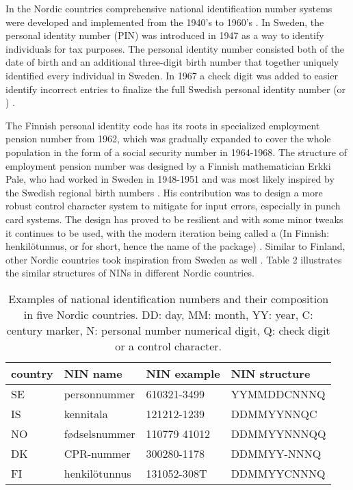 In the Nordic countries comprehensive national identification number systems were developed and implemented from the 1940's to 1960's \citep{watson2010}. In Sweden, the personal identity number (PIN) was introduced in 1947 as a way to identify individuals for tax purposes. The personal identity number consisted both of the date of birth and an additional three-digit birth number that together uniquely identified every individual in Sweden. In 1967 a check digit was added to easier identify incorrect entries to finalize the full Swedish personal identity number (or ) \citep{johansson2003,scb2016}. 

The Finnish personal identity code has its roots in specialized employment pension number from 1962, which was gradually expanded to cover the whole population in the form of a social security number in 1964-1968. The structure of employment pension number was designed by a Finnish mathematician Erkki Pale, who had worked in Sweden in 1948-1951 and was most likely inspired by the Swedish regional birth numbers \citep{alastalo2022}. His contribution was to design a more robust control character system to mitigate for input errors, especially in punch card systems. The design has proved to be resilient and with some minor tweaks it continues to be used, with the modern iteration being called a  (In Finnish: henkilötunnus, or  for short, hence the name of the package) \citep{salste2021}. Similar to Finland, other Nordic countries took inspiration from Sweden as well \citep{Krogness2011}. Table 2 illustrates the similar structures of NINs in different Nordic countries.

\begin{table}[ht]
\centering
\begin{tabular}{llll}
\toprule
  country & NIN name & NIN example & NIN structure \\
  \hline
  SE & personnummer & 610321-3499 & YYMMDDCNNNQ \\
  IS & kennitala & 121212-1239 & DDMMYYNNQC \\
  NO & fødselsnummer & 110779 41012 & DDMMYYNNNQQ \\
  DK & CPR-nummer & 300280-1178 & DDMMYY-NNNQ \\
  FI & henkilötunnus & 131052-308T & DDMMYYCNNNQ \\
\bottomrule
\end{tabular}
\caption{Examples of national identification numbers and their composition in five Nordic countries. DD: day, MM: month, YY: year, C: century marker, N: personal number numerical digit, Q: check digit or a control character.}
\label{tab:nordiccomparison2}
\end{table}

